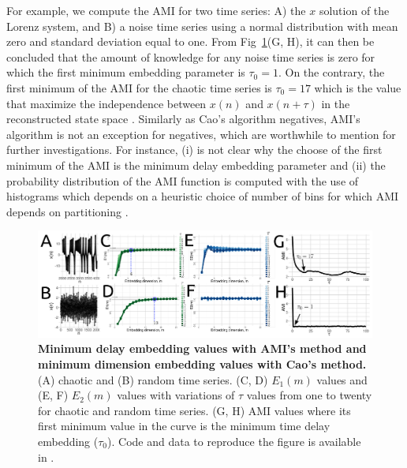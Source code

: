 \documentclass[fleqn,10pt]{wlscirep}
\begin{document}
For example, we compute the AMI for two time series:
A) the $x$ solution of the Lorenz system, and
B) a noise time series using a normal distribution with mean zero and 
standard deviation equal to one. From Fig~\ref{fig:caoami}(G, H), it can then be 
concluded that the amount of knowledge for any noise time series is zero 
for which the first minimum embedding parameter is $\tau_0=1$. 
On the contrary, the first minimum of the AMI for the chaotic time series 
is $\tau_0=17$ which is the value that maximize the independence 
between $x(n)$ and $x(n+\tau)$ in the reconstructed state space 
\cite{bradley2015}.
Similarly as Cao's algorithm negatives, AMI's algorithm is not an
exception for negatives, which are worthwhile to mention for further 
investigations.
For instance, (i) is not clear why the choose of the first minimum of the AMI 
is the minimum delay embedding parameter \cite{kantz2003} and 
(ii) the probability distribution of the AMI function is computed
with the use of histograms which depends on a heuristic choice of number of bins
for which AMI depends on partitioning \cite{garcia2005e71}.

\begin{figure}[ht]
\centering
\includegraphics[width=1.0\textwidth]{figures/methods/caoami/versions/drawing-v00.pdf}
    \caption{
	{\bf Minimum delay embedding values with AMI's method and minimum dimension embedding values with Cao's method.} 
	(A) chaotic and (B) random time series.
	(C, D) $E_1 (m)$ values and (E, F) $E_2(m)$ values 
	with variations of $\tau$ values from one to twenty
	for chaotic and random time series.
	(G, H) AMI values where its first minimum value in the curve
	is the minimum time delay embedding ($\tau_0$).
	Code and data to reproduce the figure is available in \cite{srep2020}.
        }
    \label{fig:caoami}
\end{figure}
\end{document}
